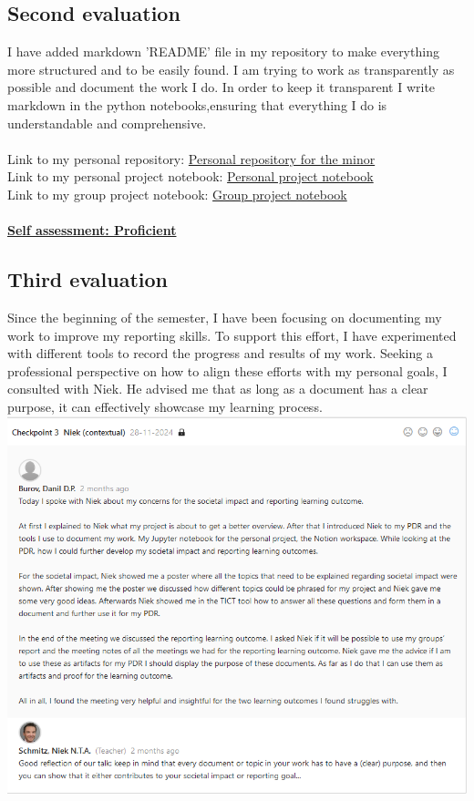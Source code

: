 \documentclass{article}
\begin{document}
\subsection{Second evaluation}
I have added markdown 'README' file in my repository to make everything more structured and to be easily found. I am trying to work as transparently as
possible and document the work I do. In order to keep it transparent I write markdown in the python notebooks,ensuring that everything I do is 
understandable and comprehensive.\\\\
Link to my personal repository: \href{https://github.com/BurovDanil/MinorAI}{Personal repository for the minor}\\
Link to my personal project notebook: \href{https://github.com/BurovDanil/MinorAI/blob/main/PythonCR/Personal%20project/UfcModel.ipynb}{Personal project notebook}\\
Link to my group project notebook: \href{https://github.com/AI-Farming-Thewi/cows_analysis/blob/stagri-farm-analysis/Stagri%20analysis.ipynb}{Group project notebook}\\\\
\underline{\textbf{Self assessment: Proficient}}

\subsection{Third evaluation}
Since the beginning of the semester, I have been focusing on documenting my work to improve my reporting skills. To support this effort, I have experimented with different tools to record the progress and results of my work. Seeking a professional perspective on how to align these efforts with my personal goals, I consulted with Niek. He advised me that as long as a document has a clear purpose, it can effectively showcase my learning process.\\
\includegraphics[width=\textwidth,keepaspectratio]{images/Feedback_Niek_1.png}\\
\end{document}
